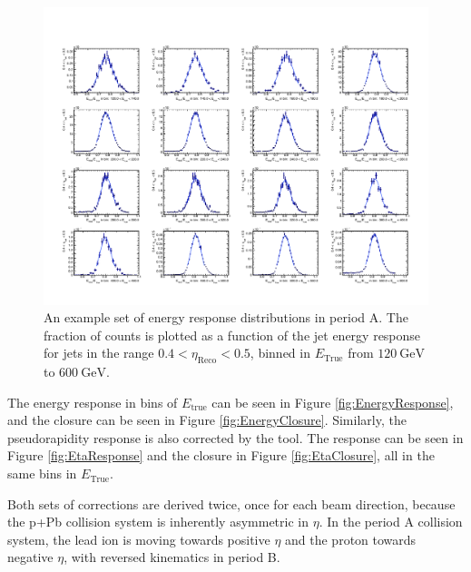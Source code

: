 \documentclass[NOTE, atlasdraft=true, texlive=2016, USenglish]{\ATLASLATEXPATH atlasdoc}
\begin{document}
\begin{figure}[htbp]
	\centering
	\includegraphics[width=\textwidth]{figures/pPb_sampleEnergyResponse.pdf}
	\caption{An example set of energy response distributions in period A. The fraction of counts is plotted as a function of the jet energy response for jets in the range $0.4<\eta_{\text{Reco}}<0.5$, binned in $E_{\text{True}}$ from $\SI{120}{\GeV}$ to $\SI{600}{\GeV}$.}
	\label{fig:SampleEnergyResponse}
\end{figure}\par
The energy response in bins of $E_{\text{true}}$ can be seen in Figure \ref{fig:EnergyResponse}, and the closure can be seen in Figure \ref{fig:EnergyClosure}. Similarly, the pseudorapidity response is also corrected by the tool. The response can be seen in Figure \ref{fig:EtaResponse} and the closure in Figure \ref{fig:EtaClosure}, all in the same bins in $E_{\text{True}}$.\par
Both sets of corrections are derived twice, once for each beam direction, because the p+Pb collision system is inherently asymmetric in $\eta$. In the period A collision system, the lead ion is moving towards positive $\eta$ and the proton towards negative $\eta$, with reversed kinematics in period B.
\end{document}
